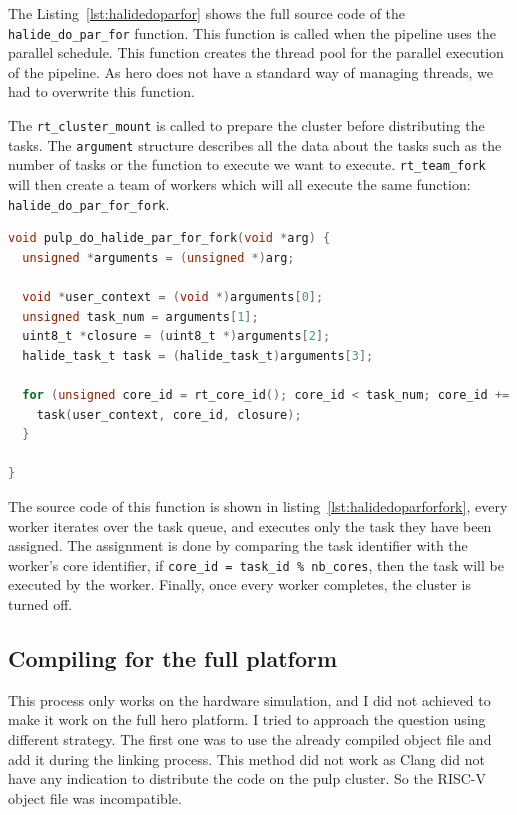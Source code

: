     The Listing~\ref{lst:halidedoparfor} shows the full source code of the \texttt{halide\_do\_par\_for} function.
    This function is called when the pipeline uses the parallel schedule.
    This function creates the thread pool for the parallel execution of the pipeline. As \gls{hero} does not have a standard way of managing threads, we had to overwrite this function.

    The \texttt{rt\_cluster\_mount} is called to prepare the cluster before distributing the tasks.
    The \texttt{argument} structure describes all the data about the tasks such as the number of tasks or the function to execute we want to execute.
    \texttt{rt\_team\_fork} will then create a team of workers which will all execute the same function: \texttt{halide\_do\_par\_for\_fork}.


\begin{lstlisting}[language=C,caption={The \texttt{halide\_do\_par\_for\_fork} function.},label={lst:halidedoparforfork},captionpos=b]
void pulp_do_halide_par_for_fork(void *arg) {
  unsigned *arguments = (unsigned *)arg;

  void *user_context = (void *)arguments[0];
  unsigned task_num = arguments[1];
  uint8_t *closure = (uint8_t *)arguments[2];
  halide_task_t task = (halide_task_t)arguments[3];

  for (unsigned core_id = rt_core_id(); core_id < task_num; core_id += (int)&__rt_nb_pe) {
    task(user_context, core_id, closure);
  }

}
\end{lstlisting}
    The source code of this function is shown in listing~\ref{lst:halidedoparforfork}, every worker iterates over the task queue, and executes only the task they have been assigned.
    The assignment is done by comparing the task identifier with the worker's core identifier, if \texttt{core\_id = task\_id \% nb\_cores}, then the task will be executed by the worker. 
    Finally, once every worker completes, the cluster is turned off.


\iffalse
    \subsection{Compiling for the  full platform}
    This process only works on the hardware simulation, and I did not achieved to make it work on the full \gls{hero} platform.
    I tried to approach the question using different strategy. The first one was to use the already compiled object file and add it during the linking process. This method did not work as Clang did not have any indication to distribute the code on the \gls{pulp} cluster. So the RISC-V object file was incompatible.

